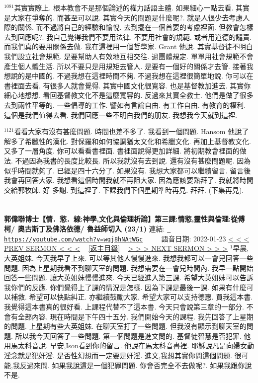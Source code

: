 \documentclass{book}
\begin{document}
$^{1081}$其實實際上.
根本教會不是那個論述的權力話語主體.
如果細心一點去看.
其實是大家在爭奪的.
而甚至可以說.
其實今天的問題是什麼呢?.
就是人很少去考慮人際的關係.
而不過將自己的經驗和愉悅.
去到擺在一個首要的考慮裡面.
但教會怎樣去到回應呢?.
我自己覺得我們不要用法律.
不要用社會的規範.
或者用道德的譴責.
而我們真的要用關係去做.
我在這裡用一個哲學家.
Grant 他說.
其實基督徒不明白我們設立社會規範.
是要幫助人有效地互相交往.
過團體規定.
單單用社會規範不會產生個人體生活.
所以不要只是用規矩去管人.
是要有一個好的關係才去管.
接著我想說的是中國的.
不過我想在這裡時間不夠.
不過我想在這裡很簡單地說.
你可以在書裡面去看.
有很多人就會覺得.
其實中國文化很寬容.
也是基督教加進去.
其實你細心地想想.
看回基督教文化不是這麼寬容的.
反過來其實全教士.
他們是做了很多去到兩性平等的.
一些倡導的工作.
譬如有言論自由.
有工作自由.
有教育的權利.
這個是我們值得去看.
我們回應一些不明白我們的朋友.
我想我今天就到這裡.

$^{1121}$看看大家有沒有甚麼問題.
時間也差不多了.
我看到一個問題.
Hansom 他說了解多了希臘性的漢化.
對保羅和如何協調猶太文化和希臘文化.
再加上基督教文化.
又多了一層角度.
你可以看看書裡面.
書裡面說得更加詳細.
將初期教會裡面的做法.
不過因為我書的長度比較長.
所以我就沒有去到說.
還有沒有甚麼問題呢.
因為似乎時間就夠了.
已經是四十六分了.
如果沒有.
我想大家都可以繼續留言.
留言後我會再回答大家.
我想看這個時間我就不再阻大家.
因為應該要熟拜了.
我就將時間交給郭牧師.
好 多謝.
到這裡了.
下課我們下個星期準時再見.
拜拜.
(下集再見).
\newpage



\section{}
\label{sec:wqj8hNAtWGc}
\textbf{郭偉聯博士【情．慾．線:神學,文化與倫理析論】第三課:情慾,靈性與倫理:從傅柯/ 奧古斯丁及佛洛依德/ 魯益師切入 (23/1)}
\newline
\newline
連結: \href{https://youtube.com/watch?v=wqj8hNAtWGc}{\texttt{ https://youtube.com/watch?v=wqj8hNAtWGc}} ~~~~ 語音日期: 2022-01-23 
\newline
\newline
\hyperref[sec:qH7MtIb583Y]{\small{< < < PREV SERMON < < <}}
~
\hyperref[sec:index]{\small{[返主目錄]}}
~
\hyperref[sec:KR0XbIoYouc]{\small{> > > NEXT SERMON > > >}}
\newline
\newline
$^{1}$早晨,大英姐妹.
今天我早了上來.
可以等其他人慢慢進來.
我想我都可以一會兒回答一些問題.
因為上星期我看不到聊天室的問題.
我想需要在一會兒時間內.
我早一點開始回答一些問題.
讓大英姐妹慢慢進來.
今天已經進入第三課.
希望大英姐妹可以告訴我你們的反應.
你們覺得上了課的情況是怎樣.
因為下課是最後一課.
如果有什麼可以補救.
希望可以快點糾正.
亦繼續鼓勵大家.
希望大家可以支持德惠.
買我這本書.
我覺得這本書真的很好看.
上課程代替不了這本書.
今天只會說第三章的一部分.
不會有全部內容.
現在時間是下午四十五分.
我們開始今天的課程.
我先回答了上星期的問題.
上星期有些大英姐妹.
在聊天室打了一些問題.
但我沒有顯示到聊天室的問題.
所以我今天回答了一些問題.
第一個問題是進文問的.
基督徒智慧是否犯罪.
他用馬太科音說.
早安,Ison看到你的留言.
他說在馬太科音書裡.
耶穌說凡是向婦女動淫念就是犯奸淫.
是否性幻想而一定要是奸淫.
進文,我想其實你問這個問題.
很可能,我反過來問.
如果我說這是一個犯罪問題.
你會否完全不去做呢?.
如果我跟你說不是.
\end{document}
